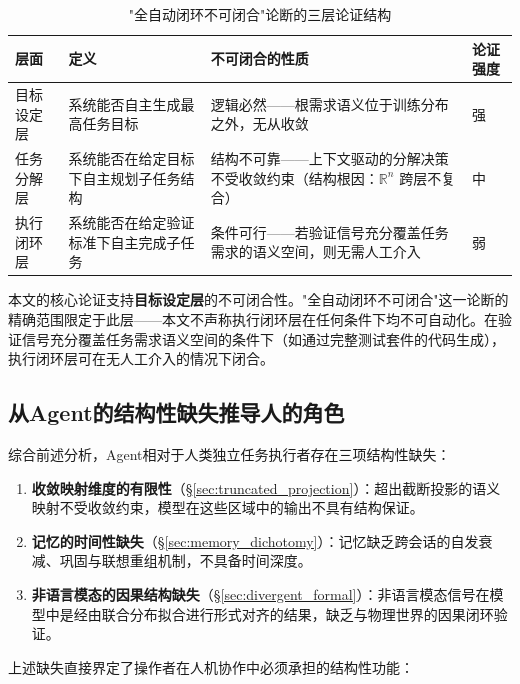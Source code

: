 \documentclass[11pt,a4paper]{article}
\theoremstyle{definition}
\begin{document}
\begin{table}[H]
\centering
\caption{"全自动闭环不可闭合"论断的三层论证结构}
\begin{tabular}{@{}p{2.2cm}p{3.5cm}p{4.5cm}p{2cm}@{}}
\toprule
\textbf{层面} & \textbf{定义} & \textbf{不可闭合的性质} & \textbf{论证强度} \\
\midrule
目标设定层 & 系统能否自主生成最高任务目标 & 逻辑必然——根需求语义位于训练分布之外，无从收敛 & 强 \\
任务分解层 & 系统能否在给定目标下自主规划子任务结构 & 结构不可靠——上下文驱动的分解决策不受收敛约束（结构根因：$\mathbb{R}^n$ 跨层不复合） & 中 \\
执行闭环层 & 系统能否在给定验证标准下自主完成子任务 & 条件可行——若验证信号充分覆盖任务需求的语义空间，则无需人工介入 & 弱 \\
\bottomrule
\end{tabular}
\end{table}

本文的核心论证支持\textbf{目标设定层}的不可闭合性。"全自动闭环不可闭合"这一论断的精确范围限定于此层——本文不声称执行闭环层在任何条件下均不可自动化。在验证信号充分覆盖任务需求语义空间的条件下（如通过完整测试套件的代码生成），执行闭环层可在无人工介入的情况下闭合。

\subsection{从Agent的结构性缺失推导人的角色}

综合前述分析，Agent相对于人类独立任务执行者存在三项结构性缺失：

\begin{enumerate}[leftmargin=*,itemsep=0.3em]
    \item \textbf{收敛映射维度的有限性}（\S\ref{sec:truncated_projection}）：超出截断投影的语义映射不受收敛约束，模型在这些区域中的输出不具有结构保证。
    \item \textbf{记忆的时间性缺失}（\S\ref{sec:memory_dichotomy}）：记忆缺乏跨会话的自发衰减、巩固与联想重组机制，不具备时间深度。
    \item \textbf{非语言模态的因果结构缺失}（\S\ref{sec:divergent_formal}）：非语言模态信号在模型中是经由联合分布拟合进行形式对齐的结果，缺乏与物理世界的因果闭环验证。
\end{enumerate}

上述缺失直接界定了操作者在人机协作中必须承担的结构性功能：
\end{document}
